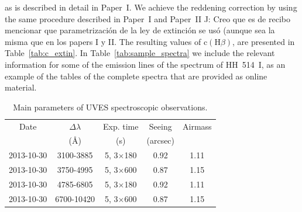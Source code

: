 \documentclass[fleqn,usenatbib]{mnras}
\newcommand{\jorge}[1]{{\color{magenta}J: #1}}
\begin{document}
as is described in detail in Paper~I. We achieve the reddening correction by using the same procedure described in Paper~I and Paper~II \jorge{Creo que es de recibo mencionar que parametrización de la ley de extinción se usó (aunque sea la misma que en los papers I y II}. The resulting values of $\text{c}(\text{H}\beta)$, are presented in Table~\ref{tab:c_extin}. In Table~\ref{tab:sample_spectra} we include the relevant information for some of the emission lines of the spectrum of HH~514~I, as an example of the tables of the complete spectra that are provided as online material.

\begin{table}
\caption{Main parameters of UVES spectroscopic observations.}
\label{tab:obs_set}
\begin{tabular}{ccccc}
\hline
Date & $\Delta \lambda$& Exp. time  &Seeing &Airmass\\
 & (\AA) &  (s) & (arcsec)&\\
\hline
2013-10-30 & 3100-3885 & 5, 3$\times$180 &0.92&1.11\\
2013-10-30 & 3750-4995 & 5, 3$\times$600 & 0.87 & 1.15\\
2013-10-30 & 4785-6805 & 5, 3$\times$180 &0.92&1.11\\
2013-10-30 & 6700-10420 & 5, 3$\times$600 & 0.87 & 1.15\\
\hline
\end{tabular}
\end{table}
\end{document}
